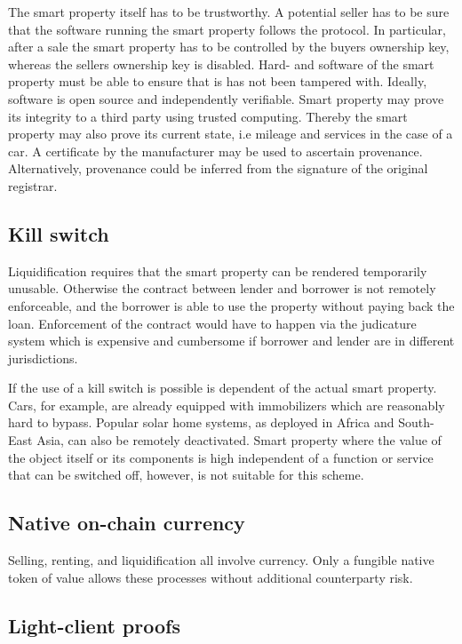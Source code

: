 The smart property itself has to be trustworthy. A potential seller has to be sure that the software running the smart property follows the protocol. In particular, after a sale the smart property has to be controlled by the buyers ownership key, whereas the sellers ownership key is disabled. Hard- and software of the smart property must be able to ensure that is has not been tampered with. Ideally, software is open source and independently verifiable. Smart property may prove its integrity to a third party using trusted computing. Thereby the smart property may also prove its current state, i.e mileage and services in the case of a car. A certificate by the manufacturer may be used to ascertain provenance. Alternatively, provenance could be inferred from the signature of the original registrar.

\subsection{Kill switch}

Liquidification requires that the smart property can be rendered temporarily unusable. Otherwise the contract between lender and borrower is not remotely enforceable, and the borrower is able to use the property without paying back the loan. Enforcement of the contract would have to happen via the judicature system which is expensive and cumbersome if borrower and lender are in different jurisdictions. 

If the use of a kill switch is possible is dependent of the actual smart property. Cars, for example, are already equipped with immobilizers which are reasonably hard to bypass. Popular solar home systems, as deployed in Africa and South-East Asia, can also be remotely deactivated. Smart property where the value of the object itself or its components is high independent of a function or service that can be switched off, however, is not suitable for this scheme. 

\subsection{Native on-chain currency}
Selling, renting, and liquidification all involve currency. Only a fungible native token of value allows these processes without additional counterparty risk. 

\subsection{Light-client proofs}

